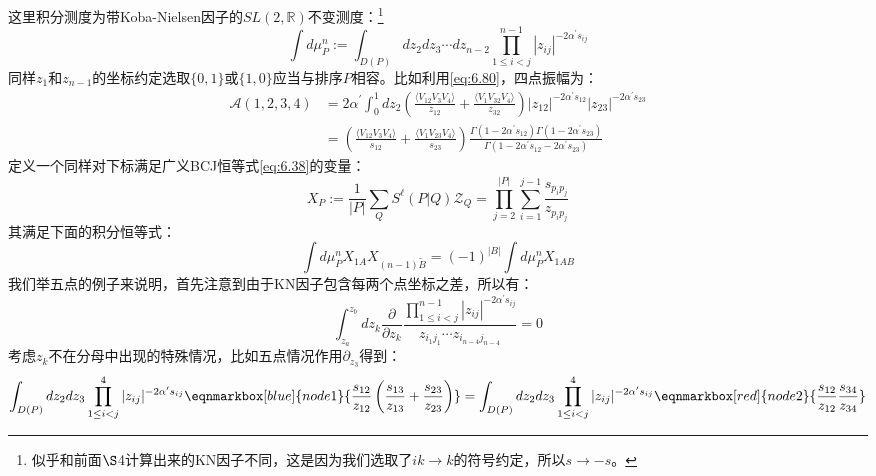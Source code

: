 这里积分测度为带Koba-Nielsen因子的$SL(2,\mathbb{R})$不变测度：\footnote{似乎和前面$\S$4计算出来的KN因子不同，这是因为我们选取了$ik\to k$的符号约定，所以$s\to -s$。}
\begin{equation}
	\int d\mu_P^n:=\int_{D(P)}dz_2dz_3\cdots dz_{n-2}\prod_{1\leq i<j}^{n-1}|z_{ij}|^{-2\alpha^{\prime}s_{ij}}
\end{equation}
同样$z_1$和$z_{n-1}$的坐标约定选取$\{0,1\}$或$\{1,0\}$应当与排序$P$相容。比如利用\ref{eq:6.80}，四点振幅为：
\begin{equation}
	\begin{aligned}
		\mathcal{A}(1,2,3,4)&=2\alpha^{\prime}\int_0^1dz_2\left(\frac{\langle V_{12}V_3V_4\rangle}{z_{12}}+\frac{\langle V_1V_{32}V_4\rangle}{z_{32}}\right)|z_{12}|^{-2\alpha^{\prime}s_{12}}|z_{23}|^{-2\alpha^{\prime}s_{23}}\\&=\left(\frac{\langle V_{12}V_3V_4\rangle}{s_{12}}+\frac{\langle V_1V_{23}V_4\rangle}{s_{23}}\right)\frac{\Gamma(1-2\alpha^{\prime}s_{12})\Gamma(1-2\alpha^{\prime}s_{23})}{\Gamma(1-2\alpha^{\prime}s_{12}-2\alpha^{\prime}s_{23})}
	\end{aligned}
\end{equation}
定义一个同样对下标满足广义BCJ恒等式\ref{eq:6.38}的变量：
\begin{equation}
	\label{eq:6.88}
	X_{P}:=\frac{1}{|P|}\sum_{ {Q}}S^{\ell}(P| {Q})\mathcal{Z}_{ {Q}}=\prod_{j=2}^{|P|}\sum_{i=1}^{j-1}\frac{s_{p_ip_j}}{z_{p_ip_j}}
\end{equation}
其满足下面的积分恒等式：
\begin{equation}
	\label{eq:6.87}
	\int d\mu_P^nX_{1A}X_{(n-1)\tilde{B}}=(-1)^{|B|}\int d\mu_P^nX_{1AB}
\end{equation}
我们举五点的例子来说明，首先注意到由于KN因子包含每两个点坐标之差，所以有：
\begin{equation}
	\int_{z_a}^{z_b}dz_k\frac{\partial}{\partial z_k}\frac{\prod_{1\leq i<j}^{n-1}|z_{ij}|^{-2\alpha^{\prime}s_{ij}}}{z_{i_1j_1}\cdots z_{i_{n-4}j_{n-4}}}=0
\end{equation}
考虑$z_k$不在分母中出现的特殊情况，比如五点情况作用$\partial_{z_3}$得到：
\begin{equation}
	\int_{D(P)}dz_2dz_3\prod_{1\leq i<j}^4|z_{ij}|^{-2\alpha^{\prime}s_{ij}}
	\eqnmarkbox[blue]{node1}{\frac{s_{12}}{z_{12}}\left(\frac{s_{13}}{z_{13}}+\frac{s_{23}}{z_{23}}\right)}
	=\int_{D(P)}dz_2dz_3\prod_{1\leq i<j}^4|z_{ij}|^{-2\alpha^{\prime}s_{ij}}
	\eqnmarkbox[red]{node2}{\frac{s_{12}}{z_{12}}\frac{s_{34}}{z_{34}}}
\end{equation}
